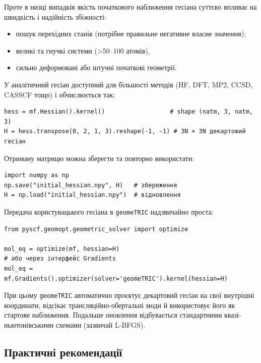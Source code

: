 Проте в низці випадків якість початкового наближення гесіана суттєво впливає на швидкість і надійність збіжності:

\begin{itemize}
    \item пошук перехідних станів (потрібне правильне негативне власне значення);
    \item великі та гнучкі системи (>50–100 атомів),%
    \item сильно деформовані або штучні початкові геометрії.
\end{itemize}

У \PySCF{} аналітичний гесіан доступний для більшості методів (HF, DFT, MP2, CCSD, CASSCF тощо) і обчислюється так:

\begin{verbatim}
hess = mf.Hessian().kernel()                  # shape (natm, 3, natm, 3)
H = hess.transpose(0, 2, 1, 3).reshape(-1, -1) # 3N × 3N декартовий гесіан
\end{verbatim}

Отриману матрицю можна зберегти та повторно використати:

\begin{verbatim}
import numpy as np
np.save("initial_hessian.npy", H)   # збереження
H = np.load("initial_hessian.npy")  # відновлення
\end{verbatim}

Передача користувацького гесіана в \texttt{geomeTRIC} надзвичайно проста:

\begin{verbatim}
from pyscf.geomopt.geometric_solver import optimize

mol_eq = optimize(mf, hessian=H)
# або через інтерфейс Gradients
mol_eq = mf.Gradients().optimizer(solver='geomeTRIC').kernel(hessian=H)
\end{verbatim}

При цьому \texttt{geomeTRIC} автоматично проєктує декартовий гесіан на свої внутрішні координати, відсікає трансляційно-обертальні моди й використовує його як стартове наближення. Подальше оновлення відбувається стандартними квазі-ньютонівськими схемами (зазвичай L-BFGS).

\subsection{Практичні рекомендації}

